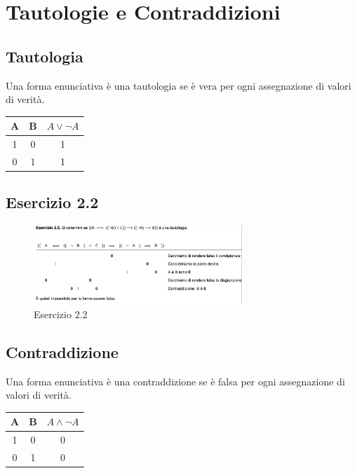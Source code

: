 \documentclass{article}
\begin{document}
\section{Tautologie e Contraddizioni}
\subsection{Tautologia}
Una forma enunciativa è una tautologia se è vera per ogni assegnazione di valori di verità.\\
\begin{center}
    \begin{tabular}{|c|c|c|}
        \hline
        A & B & $A \lor \neg A$ \\
        \hline
        1 & 0 & 1 \\
        0 & 1 & 1 \\
        \hline
    \end{tabular}
\end{center}

\subsection*{Esercizio 2.2}
\begin{figure}[h!]
    \centering
    \includegraphics[width=0.7\textwidth]{Screenshot 2024-02-21 at 11.46.14.png}
    \caption{Esercizio 2.2}
    \label{fig:ex2.2}
\end{figure}

\subsection{Contraddizione}
Una forma enunciativa è una contraddizione se è falsa per ogni assegnazione di valori di verità.\\
\begin{center}
    \begin{tabular}{|c|c|c|}
        \hline
        A & B & $A \land \neg A$ \\
        \hline
        1 & 0 & 0 \\
        0 & 1 & 0 \\
        \hline
    \end{tabular}
\end{center}
\end{document}
